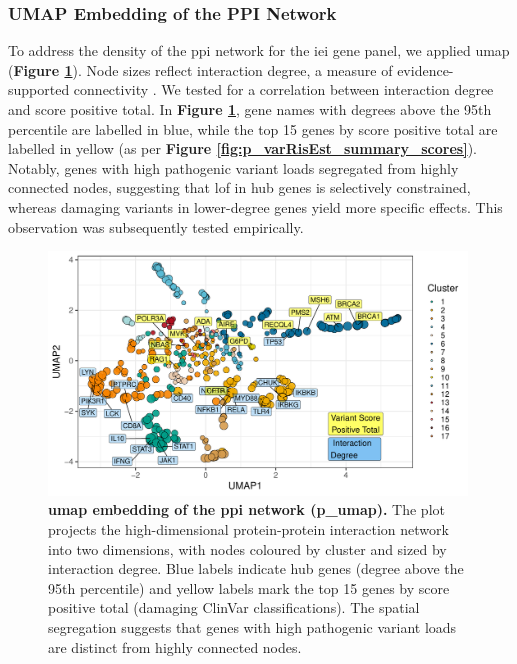 \FloatBarrier
\subsubsection{UMAP Embedding of the PPI  Network}
To address the density of the \ac{ppi} network for the \ac{iei} gene panel, we applied \ac{umap} (\textbf{Figure \ref{fig:p_umap}}). 
Node sizes reflect interaction degree, a measure of evidence-supported connectivity \cite{szklarczyk2025string}. We tested for a correlation between interaction degree and score positive total. In \textbf{Figure \ref{fig:p_umap}}, gene names with degrees above the 95th percentile are labelled in blue, while the top 15 genes by score positive total are labelled in yellow (as per \textbf{Figure \ref{fig:p_varRisEst_summary_scores}}). Notably, genes with high pathogenic variant loads segregated from highly connected nodes, suggesting that \ac{lof} in hub genes is selectively constrained, whereas damaging variants in lower-degree genes yield more specific effects. This observation was subsequently tested empirically.

\begin{figure}[ht]
  \centering
  \includegraphics[width=0.99\textwidth]{../images/untangleR_ppi_network_umap.pdf}
  \caption{
    \textbf{\ac{umap} embedding of the \ac{ppi} network (p\_umap).} 
    The plot projects the high-dimensional protein-protein interaction network into two dimensions, with nodes coloured by cluster and sized by interaction degree. Blue labels indicate hub genes (degree above the 95th percentile) and yellow labels mark the top 15 genes by score positive total (damaging ClinVar classifications). The spatial segregation suggests that genes with high pathogenic variant loads are distinct from highly connected nodes.
  }
  \label{fig:p_umap}
\end{figure}

